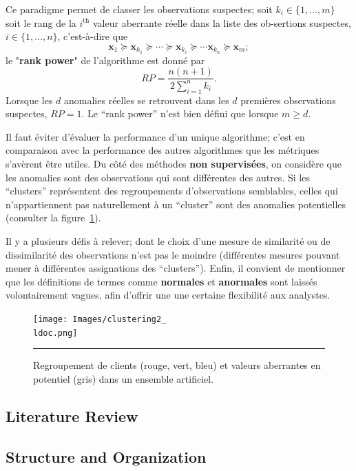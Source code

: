 \par Ce paradigme permet de classer les ob\-ser\-va\-tions suspectes; soit $k_i\in\{1,\ldots,m\}$ soit le rang de la $i^{\text{th}}$ valeur aberrante r\'eelle dans la liste des ob-ser\-tions suspectes, $i\in \{1,\ldots,n\}$, c'est-\`a-dire que $$\mathbf{x}_1\succeq \mathbf{x}_{k_1}\succeq \cdots\succeq\mathbf{x}_{k_i}\succeq \cdots \mathbf{x}_{k_n}\succeq \mathbf{x}_m;$$ le "\textbf{rank power}" de l'algorithme est donn\'e par $$RP=\frac{n(n+1)}{2\sum_{i=1}^nk_i}.$$ Lorsque les $d$ anomalies réelles se retrouvent dans les $d$ premières ob\-ser\-va\-tions suspectes, $RP= 1$. Le ``rank power'' n'est bien défini que lorsque $m\geq d$. \par Il faut \'eviter d'\'evaluer la performance d'un unique algorithme; c'est en comparaison avec la performance des autres algorithmes que les m\'etriques s'av\`erent \^etre utiles.  \newl Du côté des m\'ethodes \textbf{non supervis\'ees}, on consid\`ere que les anomalies sont des ob\-ser\-va\-tions qui sont différentes des autres. Si les ``clusters'' représentent des regroupements d'ob\-ser\-va\-tions semblables, celles qui n'appartiennent pas naturellement \`a un ``cluster'' sont des anomalies potentielles (consulter la figure~\ref{fig:clust2}). \par Il y a plusieurs d\'efis \`a relever; dont le choix  d'une mesure de similarité ou de dissimilarité des observations n'est pas le moindre (différentes mesures pouvant mener à différentes assignations des ``clusters''). \newl Enfin, il convient de mentionner que les définitions de termes comme \textbf{normales} et \textbf{anormales} sont laiss\'es volontairement vagues, afin d'offrir une  une certaine flexibilité aux analystes. 
\begin{figure}[t]
\centering
\texttt{[image: Images/clustering2\_\\ldoc.png]}
\caption{\small Regroupement de clients (rouge, vert, bleu) et valeurs aberrantes en potentiel (gris) dans un ensemble artificiel.}\hrule\label{fig:clust2}
\end{figure}

\subsection{Literature Review}
\newpage
\subsection{Structure and Organization}
\newpage